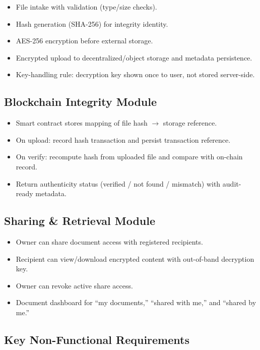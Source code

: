 \documentclass[12pt]{article}
\begin{document}
\begin{itemize}
\item File intake with validation (type/size checks).
\item Hash generation (SHA-256) for integrity identity.
\item AES-256 encryption before external storage.
\item Encrypted upload to decentralized/object storage and metadata persistence.
\item Key-handling rule: decryption key shown once to user, not stored server-side.
\end{itemize}

\subsection{Blockchain Integrity Module}

\begin{itemize}
\item Smart contract stores mapping of file hash $\rightarrow$ storage reference.
\item On upload: record hash transaction and persist transaction reference.
\item On verify: recompute hash from uploaded file and compare with on-chain record.
\item Return authenticity status (verified / not found / mismatch) with audit-ready metadata.
\end{itemize}

\subsection{Sharing \& Retrieval Module}

\begin{itemize}
\item Owner can share document access with registered recipients.
\item Recipient can view/download encrypted content with out-of-band decryption key.
\item Owner can revoke active share access.
\item Document dashboard for ``my documents,'' ``shared with me,'' and ``shared by me.''
\end{itemize}

\subsection{Key Non-Functional Requirements}
\end{document}
